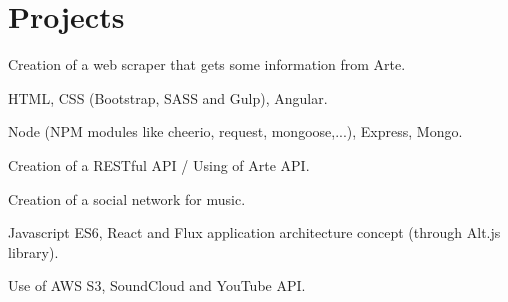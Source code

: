 \documentclass[letterpaper]{my-resume}
\begin{document}
\begin{minipage}[t]{0.66\textwidth}
\begin{tightitemize}
\end{tightitemize}

\sectionspace


\section{Projects}

Creation of a web scraper that gets some information from Arte.
\begin{tightitemize}
\item HTML, CSS (Bootstrap, SASS and Gulp), Angular.
\item Node (NPM modules like cheerio, request, mongoose,...), Express, Mongo.
\item Creation of a RESTful API / Using of Arte API.
\end{tightitemize}

\sectionspace 



Creation of a social network for music.
\begin{tightitemize}
\item Javascript ES6, React and Flux application architecture concept (through Alt.js library).
\item Use of AWS S3, SoundCloud and YouTube API.
\end{tightitemize}


\end{minipage}
\end{document}
